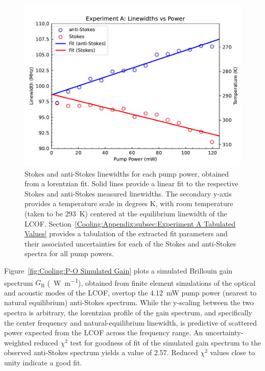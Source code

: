 \begin{figure}[t!]
  \centering
  \includegraphics[width=\textwidth]{figs/2-Cooling/P-O Linewidths.pdf}
  \caption{Stokes and anti-Stokes linewidths for each pump power, obtained from a lorentzian fit. Solid lines provide a linear fit to the respective Stokes and anti-Stokes measured linewidths. The secondary y-axis provides a temperature scale in degrees \si{\kelvin}, with room temperature (taken to be \SI{293}{\kelvin}) centered at the equilibrium linewidth of the \ac{LCOF}. Section~\ref{Cooling:Appendix:subsec:Experiment A Tabulated Values} provides a tabulation of the extracted fit parameters and their associated uncertainties for each of the Stokes and anti-Stokes spectra for all pump powers.}
  \label{fig:Cooling:P-O Linewidths}
\end{figure}

Figure~\ref{fig:Cooling:P-O Simulated Gain} plots a simulated Brillouin gain spectrum \(G_{\mathrm{B}}\) (\si{\per\watt\per\meter}), obtained from finite element simulations\cite{johnson2023laser} of the optical and acoustic modes of the \ac{LCOF}, overtop the \SI{4.12}{\milli\watt} pump power (nearest to natural equilibrium) anti-Stokes spectrum. While the y-scaling between the two spectra is arbitrary, the lorentzian profile of the gain spectrum, and specifically the center frequency and natural-equilibrium linewidth, is predictive of scattered power expected from the \ac{LCOF} across the frequency range. An uncertainty-weighted reduced \(\chi^{2}\) test for goodness of fit of the simulated gain spectrum to the observed anti-Stokes spectrum yields a value of 2.57. Reduced \(\chi^{2}\) values close to unity indicate a good fit.

